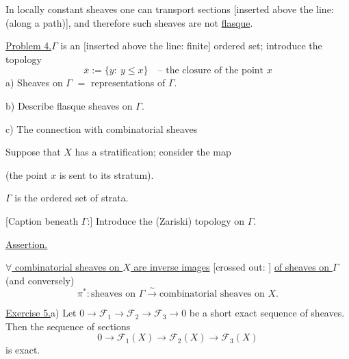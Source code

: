 


In locally constant sheaves one can transport sections [inserted above the line: (along a path)],
and therefore such sheaves are not \underline{flasque}.

\underline{Problem 4.}\quad $\Gamma$ is an [inserted above the line: finite] ordered set; introduce the topology
\begin{equation*}
\overline{x}:=\{y:\ y\leq x\}\quad\text{-- the closure of the point }x
\end{equation*}
a) Sheaves on $\Gamma$ $=$ representations of $\Gamma$.

b) Describe flasque sheaves on $\Gamma$.


c) The connection with combinatorial sheaves

Suppose that $X$ has a stratification; consider the map
(the point $x$ is sent to its stratum).

$\Gamma$ is the ordered set of strata.

[Caption beneath $\Gamma$:] Introduce the (Zariski) topology on $\Gamma$.

\underline{Assertion.}

\underline{$\forall$ combinatorial sheaves on $X$ are inverse images}
[crossed out: ]
\underline{of sheaves on $\Gamma$}
(and conversely)
\begin{equation*}
\pi^*\colon\text{sheaves on }\Gamma\overset{\sim}{\longrightarrow}
\text{combinatorial sheaves on }X.
\end{equation*}

\underline{Exercise 5.}\quad a) Let
$0\longrightarrow\mathcal F_1\longrightarrow\mathcal F_2\longrightarrow\mathcal F_3\longrightarrow0$
be a short exact sequence of sheaves. Then the sequence of sections
\begin{equation*}
0\longrightarrow\mathcal F_1(X)\longrightarrow\mathcal F_2(X)\longrightarrow\mathcal F_3(X)
\end{equation*}
is exact.

